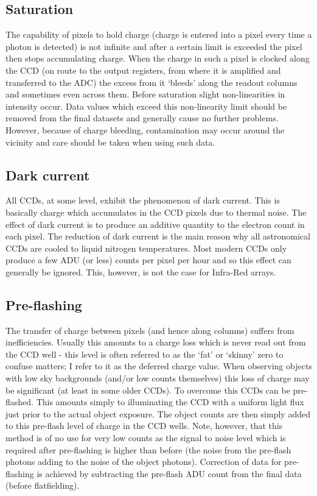 \documentclass[twoside,11pt]{article}
\newcommand{\xlabel}[1]{}
\renewcommand{\_}{\texttt{\symbol{95}}}
\begin{document}
\subsection{Saturation\xlabel{CCDglossaturation}}
The capability of pixels to hold charge (charge is entered into a pixel
every time a photon is detected) is not infinite and after a certain
limit is exceeded the pixel then stops accumulating charge. When the
charge in such a pixel is clocked along the CCD (on route to the output
registers, from where it is amplified and transferred to the ADC) the
excess from it `bleeds' along the readout columns and sometimes even
across them. Before saturation slight non-linearities in
intensity occur. Data values which exceed this non-linearity limit
should be removed from the final datasets and generally cause no further
problems. However, because of charge bleeding, contamination may occur
around the vicinity and care should be taken when using such data.

\subsection{Dark current\xlabel{CCDglosdarkcurrent}}
All CCDs, at some level, exhibit the phenomenon of dark current. This is
basically charge which accumulates in the CCD pixels due to thermal
noise. The effect of dark current is to produce an additive quantity to
the electron count in each pixel. The reduction of dark current is the
main reason why all astronomical CCDs are cooled to liquid nitrogen
temperatures. Most modern CCDs only produce a few ADU (or less) counts
per pixel per hour and so this effect can generally be ignored. This,
however, is not the case for Infra-Red arrays.

\subsection{Pre-flashing\xlabel{CCDglospreflash}}
The transfer of charge between pixels (and hence along columns) suffers
from inefficiencies. Usually this amounts to a charge loss which is
never read out from the CCD well - this level is often referred to as
the `fat' or `skinny' zero to confuse matters; I refer to it as the
deferred charge value. When observing objects with low sky backgrounds
(and/or low counts themselves) this loss of charge may be significant
(at least in some older CCDs). To overcome this CCDs can be pre-flashed.
This amounts simply to illuminating the CCD with a uniform light flux
just prior to the actual object exposure. The object counts are then
simply added to this pre-flash level of charge in the CCD wells. Note,
however, that this method is of no use for very low counts as the signal
to noise level which is required after pre-flashing is higher than
before (the noise from the pre-flash photons adding to the noise of the
object photons). Correction of data for pre-flashing is achieved by
subtracting the pre-flash ADU count from the final data (before
flatfielding).
\end{document}
